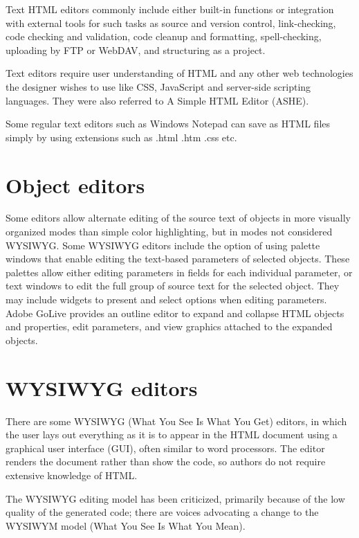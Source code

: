 Text HTML editors commonly include either built-in functions or integration with external tools for such tasks as source and version control, link-checking, code checking and validation, code cleanup and formatting, spell-checking, uploading by FTP or WebDAV, and structuring as a project.

Text editors require user understanding of HTML and any other web technologies the designer wishes to use like CSS, JavaScript and server-side scripting languages. They were also referred to A Simple HTML Editor (ASHE).

Some regular text editors such as Windows Notepad can save as HTML files simply by using extensions such as .html .htm .css etc.


\section{Object editors}

Some editors allow alternate editing of the source text of objects in more visually organized modes than simple color highlighting, but in modes not considered WYSIWYG. Some WYSIWYG editors include the option of using palette windows that enable editing the text-based parameters of selected objects. These palettes allow either editing parameters in fields for each individual parameter, or text windows to edit the full group of source text for the selected object. They may include widgets to present and select options when editing parameters. Adobe GoLive provides an outline editor to expand and collapse HTML objects and properties, edit parameters, and view graphics attached to the expanded objects.




\section{WYSIWYG editors}

There are some WYSIWYG (What You See Is What You Get) editors, in which the user lays out everything as it is to appear in the HTML document using a graphical user interface (GUI), often similar to word processors. The editor renders the document rather than show the code, so authors do not require extensive knowledge of HTML.



The WYSIWYG editing model has been criticized, primarily because of the low quality of the generated code; there are voices advocating a change to the WYSIWYM model (What You See Is What You Mean).

